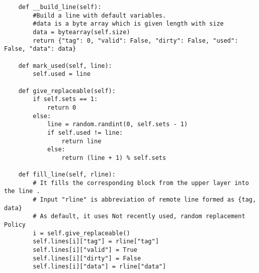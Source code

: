 \begin{lstlisting}
    def __build_line(self):
        #Build a line with default variables.
        #data is a byte array which is given length with size
        data = bytearray(self.size)
        return {"tag": 0, "valid": False, "dirty": False, "used": False, "data": data}

    def mark_used(self, line):
        self.used = line

    def give_replaceable(self):
        if self.sets == 1:
            return 0
        else:
            line = random.randint(0, self.sets - 1)
            if self.used != line:
                return line
            else:
                return (line + 1) % self.sets

    def fill_line(self, rline):
        # It fills the corresponding block from the upper layer into the line .
        # Input "rline" is abbreviation of remote line formed as {tag, data}
        # As default, it uses Not recently used, random replacement Policy
        i = self.give_replaceable()
        self.lines[i]["tag"] = rline["tag"]
        self.lines[i]["valid"] = True
        self.lines[i]["dirty"] = False
        self.lines[i]["data"] = rline["data"]
\end{lstlisting}